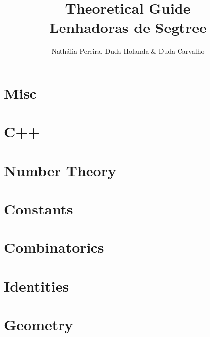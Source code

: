 \documentclass[10pt, twocolumn]{article}
\title{\vspace{-2cm}\textbf{Theoretical Guide\\Lenhadoras de Segtree}}
\author{Nathália Pereira, Duda Holanda $\&$ Duda Carvalho}
\date{}
\begin{document}
\maketitle
\tableofcontents\section{Misc}


\section{C++}


\section{Number Theory}











\section{Constants}

\section{Combinatorics}


\section{Identities}

\section{Geometry}








\end{document}
